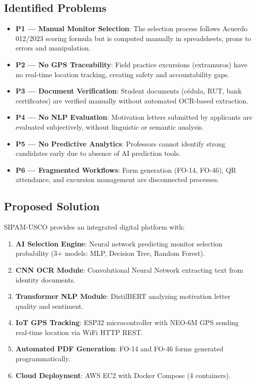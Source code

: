 \documentclass[12pt,a4paper]{report}
\begin{document}
\subsection{Identified Problems}
\begin{itemize}
    \item \textbf{P1 — Manual Monitor Selection}: The selection process follows Acuerdo 012/2023 scoring formula but is computed manually in spreadsheets, prone to errors and manipulation.
    \item \textbf{P2 — No GPS Traceability}: Field practice excursions (extramuros) have no real-time location tracking, creating safety and accountability gaps.
    \item \textbf{P3 — Document Verification}: Student documents (cédula, RUT, bank certificates) are verified manually without automated OCR-based extraction.
    \item \textbf{P4 — No NLP Evaluation}: Motivation letters submitted by applicants are evaluated subjectively, without linguistic or semantic analysis.
    \item \textbf{P5 — No Predictive Analytics}: Professors cannot identify strong candidates early due to absence of AI prediction tools.
    \item \textbf{P6 — Fragmented Workflows}: Form generation (FO-14, FO-46), QR attendance, and excursion management are disconnected processes.
\end{itemize}

\subsection{Proposed Solution}
SIPAM-USCO provides an integrated digital platform with:
\begin{enumerate}
    \item \textbf{AI Selection Engine}: Neural network predicting monitor selection probability (3+ models: MLP, Decision Tree, Random Forest).
    \item \textbf{CNN OCR Module}: Convolutional Neural Network extracting text from identity documents.
    \item \textbf{Transformer NLP Module}: DistilBERT analyzing motivation letter quality and sentiment.
    \item \textbf{IoT GPS Tracking}: ESP32 microcontroller with NEO-6M GPS sending real-time location via WiFi HTTP REST.
    \item \textbf{Automated PDF Generation}: FO-14 and FO-46 forms generated programmatically.
    \item \textbf{Cloud Deployment}: AWS EC2 with Docker Compose (4 containers).
\end{enumerate}
\end{document}
